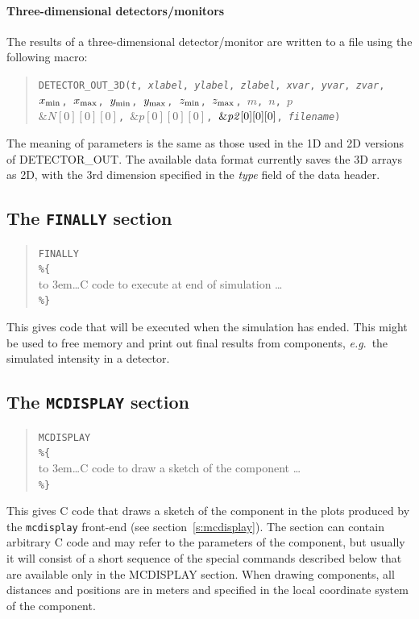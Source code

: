 \paragraph{Three-dimensional detectors/monitors}

The results of a three-dimensional detector/\discretionary{}{}{}mon\-i\-tor are written to a file using the
following macro:

\begin{quote}
  \texttt{DETECTOR\_OUT\_3D({\it t},
        {\it xlabel}, {\it ylabel}, {\it zlabel},
        {\it xvar}, {\it yvar}, {\it zvar},
        $x_{\rm min}$, $x_{\rm max}$, $y_{\rm min}$, $y_{\rm max}$,
        $z_{\rm min}$, $z_{\rm max}$, $m$, $n$, $p$\\
          $\&N[0][0][0]$, $\&p[0][0][0]$, $\&{\it p2}[0][0][0]$,
        {\it filename})}
\end{quote}
The meaning of parameters is the same as those used in the 1D and 2D
versions of DETECTOR\_OUT. The available data format currently saves
the 3D arrays as 2D, with the 3rd dimension specified in the {\it
  type} field of the data header.

\subsection{The \texttt{FINALLY} section}
\label{s:comp-finally}

\begin{quote}
  \texttt{FINALLY} \\
  \verb|%{| \\
  \hbox to 3em{}\ldots C code to execute at end of simulation \ldots \\
  \verb|%}|
\end{quote}
This gives code that will be executed when the simulation has
ended. This might be used to free memory and print out final results from components, \textit{e.g}.\ the
simulated intensity in a detector.

\subsection{The \texttt{MCDISPLAY} section}
\label{s:comp-mcdisplay}

\begin{quote}
  \texttt{MCDISPLAY} \\
  \verb|%{| \\
  \hbox to 3em{}\ldots C code to draw a sketch of the component \ldots \\
  \verb|%}|
\end{quote}
This gives C code that draws a sketch of the component in the plots
produced by the \verb+mcdisplay+ front-end (see
section~\ref{s:mcdisplay}). The section can contain arbitrary C code and
may refer to the parameters of the component, but usually it will
consist of a short sequence of the special commands described below that
are available only in the MCDISPLAY section.
When drawing components, all distances and positions are in meters and
specified in the local coordinate system of the component.

